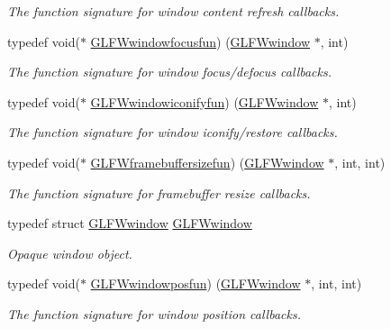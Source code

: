 \begin{DoxyCompactItemize}
\begin{DoxyCompactList}\small\item\em The function signature for window content refresh callbacks. \end{DoxyCompactList}\item 
typedef void($\ast$ \hyperlink{group__window_ga58be2061828dd35080bb438405d3a7e2}{G\+L\+F\+Wwindowfocusfun}) (\hyperlink{group__window_ga3c96d80d363e67d13a41b5d1821f3242}{G\+L\+F\+Wwindow} $\ast$, int)
\begin{DoxyCompactList}\small\item\em The function signature for window focus/defocus callbacks. \end{DoxyCompactList}\item 
typedef void($\ast$ \hyperlink{group__window_gad2d4e4c3d28b1242e742e8268b9528af}{G\+L\+F\+Wwindowiconifyfun}) (\hyperlink{group__window_ga3c96d80d363e67d13a41b5d1821f3242}{G\+L\+F\+Wwindow} $\ast$, int)
\begin{DoxyCompactList}\small\item\em The function signature for window iconify/restore callbacks. \end{DoxyCompactList}\item 
typedef void($\ast$ \hyperlink{group__window_ga3e218ef9ff826129c55a7d5f6971a285}{G\+L\+F\+Wframebuffersizefun}) (\hyperlink{group__window_ga3c96d80d363e67d13a41b5d1821f3242}{G\+L\+F\+Wwindow} $\ast$, int, int)
\begin{DoxyCompactList}\small\item\em The function signature for framebuffer resize callbacks. \end{DoxyCompactList}\item 
typedef struct \hyperlink{group__window_ga3c96d80d363e67d13a41b5d1821f3242}{G\+L\+F\+Wwindow} \hyperlink{group__window_ga3c96d80d363e67d13a41b5d1821f3242}{G\+L\+F\+Wwindow}
\begin{DoxyCompactList}\small\item\em Opaque window object. \end{DoxyCompactList}\item 
typedef void($\ast$ \hyperlink{group__window_gafd8db81fdb0e850549dc6bace5ed697a}{G\+L\+F\+Wwindowposfun}) (\hyperlink{group__window_ga3c96d80d363e67d13a41b5d1821f3242}{G\+L\+F\+Wwindow} $\ast$, int, int)
\begin{DoxyCompactList}\small\item\em The function signature for window position callbacks. \end{DoxyCompactList}\item 

\end{DoxyCompactItemize}
